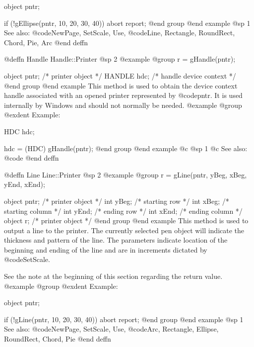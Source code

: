 object  pntr;

if (!gEllipse(pntr, 10, 20, 30, 40))
        abort report;
@end group
@end example
@sp 1
See also:  @code{NewPage, SetScale, Use,}
        @code{Line, Rectangle, RoundRect, Chord, Pie, Arc}
@end deffn













@deffn {Handle} Handle::Printer
@sp 2
@example
@group
r = gHandle(pntr); 

object  pntr;   /*  printer object         */
HANDLE  hdc;    /*  handle device context  */
@end group
@end example
This method is used to obtain the device context handle associated with
an opened printer represented by @code{pntr}.  It is used internally
by Windows and should not normally be needed.
@example
@group
@exdent Example:

HDC     hdc;

hdc = (HDC) gHandle(pntr);
@end group
@end example
@c @sp 1
@c See also:  @code{}
@end deffn

















@deffn {Line} Line::Printer
@sp 2
@example
@group
r = gLine(pntr, yBeg, xBeg, yEnd, xEnd);

object  pntr;   /*  printer object   */
int     yBeg;   /*  starting row     */
int     xBeg;   /*  starting column  */
int     yEnd;   /*  ending row       */
int     xEnd;   /*  ending column    */
object  r;      /*  printer object   */
@end group
@end example
This method is used to output a line to the printer.  The currently
selected pen object will indicate the thickness and pattern of the line.
The parameters indicate location of the beginning and ending of the line
and are in increments dictated by @code{SetScale}.

See the note at the beginning of this section regarding the return value.
@example
@group
@exdent Example:

object  pntr;

if (!gLine(pntr, 10, 20, 30, 40))
        abort report;
@end group
@end example
@sp 1
See also:  @code{NewPage, SetScale, Use,}
        @code{Arc, Rectangle, Ellipse, RoundRect, Chord, Pie}
@end deffn












